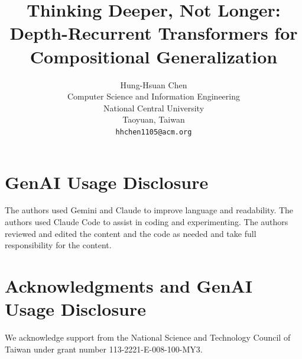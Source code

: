 \documentclass{article}
\title{Thinking Deeper, Not Longer: Depth-Recurrent Transformers for Compositional Generalization
}
\author{
  Hung-Hsuan Chen \\
  Computer Science and Information Engineering \\
  National Central University \\
  Taoyuan, Taiwan \\
  \texttt{hhchen1105@acm.org}
}
\begin{document}
\maketitle










\section*{GenAI Usage Disclosure}
The authors used Gemini and Claude to improve language and readability. The authors used Claude Code to assist in coding and experimenting. The authors reviewed and edited the content and the code as needed and take full responsibility for the content.

\section*{Acknowledgments and GenAI Usage Disclosure}
We acknowledge support from the National Science and Technology Council of Taiwan under grant number 113-2221-E-008-100-MY3. 

  
  

\appendix


\end{document}
